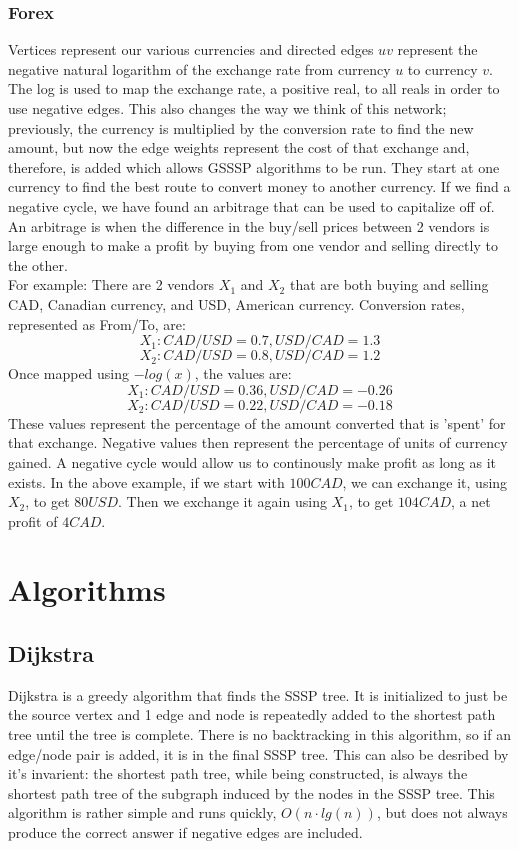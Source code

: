 \documentclass{article}
\begin{document}
\subsubsection{Forex}
Vertices represent our various currencies and directed edges $uv$ represent the negative natural logarithm of the exchange rate from currency $u$ to currency $v$. The log is used to map the exchange rate, a positive real, to all reals in order to use negative edges. This also changes the way we think of this network; previously, the currency is multiplied by the conversion rate to find the new amount, but now the edge weights represent the cost of that exchange and, therefore, is added which allows GSSSP algorithms to be run. They start at one currency to find the best route to convert money to another currency. If we find a negative cycle, we have found an arbitrage that can be used to capitalize off of. An arbitrage is when the difference in the buy/sell prices between 2 vendors is large enough to make a profit by buying from one vendor and selling directly to the other. \\
For example: There are 2 vendors $X_1$ and $X_2$ that are both buying and selling CAD, Canadian currency, and USD, American currency. Conversion rates, represented as From/To, are:
\[X_1: CAD/USD = 0.7, USD/CAD = 1.3\]
\[X_2: CAD/USD = 0.8, USD/CAD = 1.2\]
Once mapped using $-log(x)$, the values are:
\[X_1: CAD/USD = 0.36, USD/CAD = -0.26\]
\[X_2: CAD/USD = 0.22, USD/CAD = -0.18\]
These values represent the percentage of the amount converted that is 'spent' for that exchange. Negative values then represent the percentage of units of currency gained. A negative cycle would allow us to continously make profit as long as it exists. In the above example, if we start with $100CAD$, we can exchange it, using $X_2$, to get $80USD$. Then we exchange it again using $X_1$, to get $104CAD$, a net profit of $4CAD$.


\section{Algorithms}

\subsection{Dijkstra}
Dijkstra \cite{Dijkstra} is a greedy algorithm that finds the SSSP tree. It is initialized to just be the source vertex and 1 edge and node is repeatedly added to the shortest path tree until the tree is complete. There is no backtracking in this algorithm, so if an edge/node pair is added, it is in the final SSSP tree. This can also be desribed by it's invarient: the shortest path tree, while being constructed, is always the shortest path tree of the subgraph induced by the nodes in the SSSP tree. This algorithm is rather simple and runs quickly, $O(n \cdot lg(n))$, but does not always produce the correct answer if negative edges are included.
\end{document}
